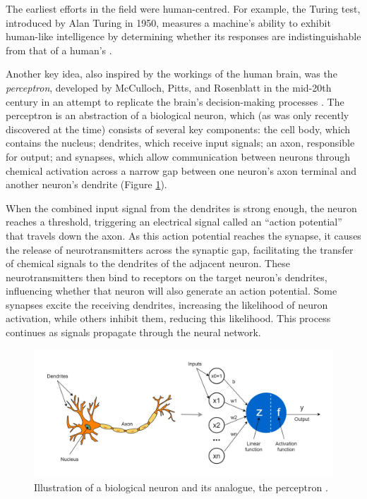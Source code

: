 The earliest efforts in the field were human-centred. For example, the Turing test, introduced by Alan Turing in 1950, measures a machine’s ability to exhibit human-like intelligence by determining whether its responses are indistinguishable from that of a human’s \cite{turing_computing_1950}. 

Another key idea, also inspired by the workings of the human brain, was the \textit{perceptron}, developed by McCulloch, Pitts, and Rosenblatt in the mid-20th century in an attempt to replicate the brain's decision-making processes \cite{mcculloch_logical_1943, rosenblatt_perceptron_1958}. The perceptron is an abstraction of a biological neuron, which (as was only recently discovered at the time) consists of several key components: the cell body, which contains the nucleus; dendrites, which receive input signals; an axon, responsible for output; and synapses, which allow communication between neurons through chemical activation across a narrow gap between one neuron's axon terminal and another neuron's dendrite (Figure \ref{fig:biological-neuron}). 

When the combined input signal from the dendrites is strong enough, the neuron reaches a threshold, triggering an electrical signal called an ``action potential'' that travels down the axon. As this action potential reaches the synapse, it causes the release of neurotransmitters across the synaptic gap, facilitating the transfer of chemical signals to the dendrites of the adjacent neuron. These neurotransmitters then bind to receptors on the target neuron's dendrites, influencing whether that neuron will also generate an action potential. Some synapses excite the receiving dendrites, increasing the likelihood of neuron activation, while others inhibit them, reducing this likelihood. This process continues as signals propagate through the neural network.

\begin{figure}[tb]
    \centering
    \includegraphics[width=\textwidth]{img/ch1/neuron.png}
    \caption{Illustration of a biological neuron and its analogue, the perceptron \cite{pramoditha_concept_2021}.}
    \label{fig:biological-neuron}
\end{figure}

